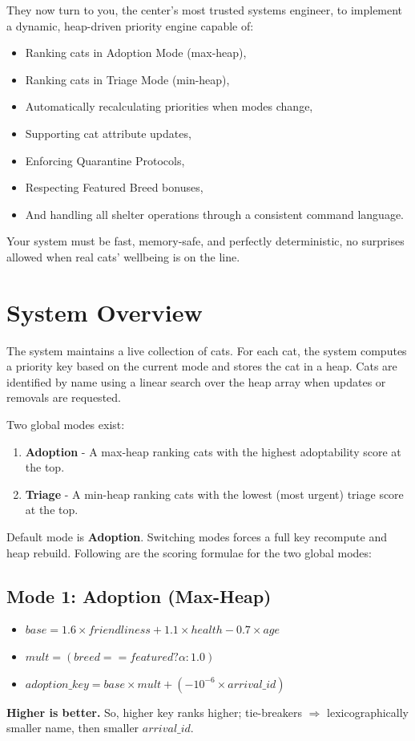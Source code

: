\documentclass[11pt]{article}
\begin{document}
They now turn to you, the center’s most trusted systems engineer, to implement a dynamic, heap-driven priority engine capable of:
\begin{itemize}
    \item Ranking cats in Adoption Mode (max-heap),
    \item Ranking cats in Triage Mode (min-heap),
    \item Automatically recalculating priorities when modes change,
    \item Supporting cat attribute updates,
    \item Enforcing Quarantine Protocols,
    \item Respecting Featured Breed bonuses,
    \item And handling all shelter operations through a consistent command language.
\end{itemize}

Your system must be fast, memory-safe, and perfectly deterministic, no surprises allowed when real cats’ wellbeing is on the line.

\newpage

\section*{System Overview}
The system maintains a live collection of cats. For each cat, the system computes a priority key based on the current mode and stores the cat in a heap. Cats are identified by name using a linear search over the heap array when updates or removals are requested. 

Two global modes exist:
\begin{enumerate}
    \item \textbf{Adoption} - A max-heap ranking cats with the highest adoptability score at the top.
    \item \textbf{Triage} - A min-heap ranking cats with the lowest (most urgent) triage score at the top.
\end{enumerate}

Default mode is \textbf{Adoption}. Switching modes forces a full key recompute and heap rebuild. Following are the scoring formulae for the two global modes:

\subsection*{Mode 1: Adoption (Max-Heap)}
\begin{itemize}
    \item $base = 1.6 \times friendliness + 1.1 \times health - 0.7 \times age$
    \item $mult = (breed == featured ? \alpha : 1.0)$
    \item $adoption\_key = base \times mult + (-10^{-6} \times arrival\_id)$
\end{itemize}
\textbf{Higher is better.} So, higher key ranks higher; tie-breakers $\Rightarrow$ lexicographically smaller name, then smaller $arrival\_id$.
\end{document}
